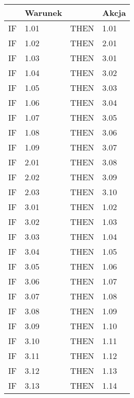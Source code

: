 \begin{tabular}{c|p{4cm}|c|p{4cm}}
 & Warunek & & Akcja\\
\hline
IF & 1.01 & THEN & 1.01\\
IF & 1.02 & THEN & 2.01\\
IF & 1.03 & THEN & 3.01\\
IF & 1.04 & THEN & 3.02\\
IF & 1.05 & THEN & 3.03\\
IF & 1.06 & THEN & 3.04\\
IF & 1.07 & THEN & 3.05\\
IF & 1.08 & THEN & 3.06\\
IF & 1.09 & THEN & 3.07\\
IF & 2.01 & THEN & 3.08\\
IF & 2.02 & THEN & 3.09\\
IF & 2.03 & THEN & 3.10\\
IF & 3.01 & THEN & 1.02\\
IF & 3.02 & THEN & 1.03\\
IF & 3.03 & THEN & 1.04\\
IF & 3.04 & THEN & 1.05\\
IF & 3.05 & THEN & 1.06\\
IF & 3.06 & THEN & 1.07\\
IF & 3.07 & THEN & 1.08\\
IF & 3.08 & THEN & 1.09\\
IF & 3.09 & THEN & 1.10\\
IF & 3.10 & THEN & 1.11\\
IF & 3.11 & THEN & 1.12\\
IF & 3.12 & THEN & 1.13\\
IF & 3.13 & THEN & 1.14\\
\end{tabular}

